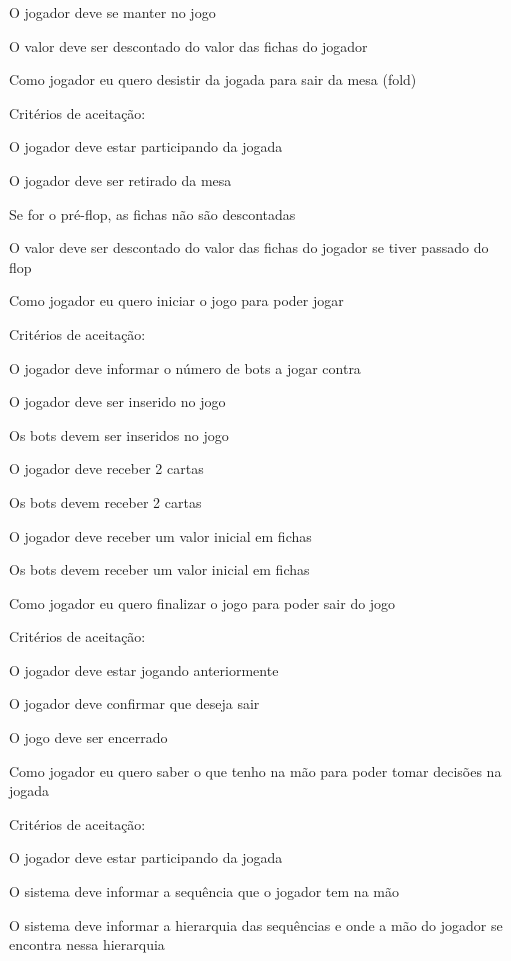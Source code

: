 \begin{DoxyItemize}
\begin{DoxyItemize}
\item O jogador deve se manter no jogo
\item O valor deve ser descontado do valor das fichas do jogador
\end{DoxyItemize}
\item Como jogador eu quero desistir da jogada para sair da mesa (fold)
\item Critérios de aceitação\+:
\begin{DoxyItemize}
\item O jogador deve estar participando da jogada
\item O jogador deve ser retirado da mesa
\item Se for o pré-\/flop, as fichas não são descontadas
\item O valor deve ser descontado do valor das fichas do jogador se tiver passado do flop
\end{DoxyItemize}
\item Como jogador eu quero iniciar o jogo para poder jogar
\item Critérios de aceitação\+:
\begin{DoxyItemize}
\item O jogador deve informar o número de bots a jogar contra
\item O jogador deve ser inserido no jogo
\item Os bots devem ser inseridos no jogo
\item O jogador deve receber 2 cartas
\item Os bots devem receber 2 cartas
\item O jogador deve receber um valor inicial em fichas
\item Os bots devem receber um valor inicial em fichas
\end{DoxyItemize}
\item Como jogador eu quero finalizar o jogo para poder sair do jogo
\item Critérios de aceitação\+:
\begin{DoxyItemize}
\item O jogador deve estar jogando anteriormente
\item O jogador deve confirmar que deseja sair
\item O jogo deve ser encerrado
\end{DoxyItemize}
\item Como jogador eu quero saber o que tenho na mão para poder tomar decisões na jogada
\item Critérios de aceitação\+:
\begin{DoxyItemize}
\item O jogador deve estar participando da jogada
\item O sistema deve informar a sequência que o jogador tem na mão
\item O sistema deve informar a hierarquia das sequências e onde a mão do jogador se encontra nessa hierarquia
\end{DoxyItemize}
\end{DoxyItemize}

